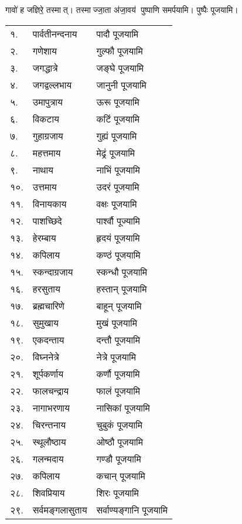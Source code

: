 \begin{center}
{गावो॑ ह जज्ञिरे॒ तस्मात्। तस्माज्जा॒ता अ॑जा॒वय॑}
पुष्पाणि समर्पयामि।  पुष्पैः पूजयामि।

\begin{longtable}{ll@{~नमः — }l}
१. & पार्वतीनन्दनाय & पादौ पूजयामि\\
२. & गणेशाय & गुल्फौ पूजयामि\\
३. & जगद्धात्रे & जङ्घे पूजयामि\\
४. & जगद्वल्लभाय & जानुनी पूजयामि\\
५. & उमापुत्राय & ऊरू पूजयामि\\
६. & विकटाय & कटिं पूजयामि\\
७. & गुहाग्रजाय & गुह्यं पूजयामि\\
८. & महत्तमाय & मेढ्रं पूजयामि\\
९. & नाथाय & नाभिं पूजयामि\\
१०. & उत्तमाय & उदरं पूजयामि\\
११. & विनायकाय & वक्षः पूजयामि\\
१२. & पाशच्छिदे & पार्श्वौ पूज्यामि\\
१३. & हेरम्बाय & हृदयं पूजयामि\\
१४. & कपिलाय & कण्ठं पूजयामि\\
१५. & स्कन्दाग्रजाय & स्कन्धौ पूजयामि\\
१६. & हरसुताय & हस्तान् पूजयामि\\
१७. & ब्रह्मचारिणे & बाहून् पूजयामि\\
१८. & सुमुखाय & मुखं पूजयामि\\
१९. & एकदन्ताय & दन्तौ पूजयामि\\
२०. & विघ्ननेत्रे & नेत्रे पूजयामि\\
२१. & शूर्पकर्णाय & कर्णौ पूजयामि\\
२२. & फालचन्द्राय & फालं पूजयामि\\
२३. & नागाभरणाय & नासिकां पूजयामि\\
२४. & चिरन्तनाय & चुबुकं पूजयामि\\
२५. & स्थूलौष्ठाय & ओष्ठौ पूजयामि\\
२६. & गलन्मदाय & गण्डौ पूजयामि\\
२७. & कपिलाय & कचान् पूजयामि\\
२८. & शिवप्रियाय & शिरः पूजयामि\\
२९. & सर्वमङ्गलासुताय & सर्वाण्यङ्गानि पूजयामि\\

\end{longtable}



\end{center}
